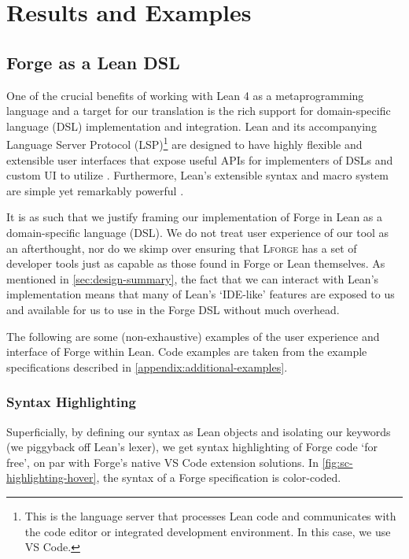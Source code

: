 \section{Results and Examples}

\subsection{Forge as a Lean DSL}\label{sec:dsl}
One of the crucial benefits of working with Lean 4 as a metaprogramming language and a target for our translation is the rich support for domain-specific language (DSL) implementation and integration. Lean and its accompanying Language Server Protocol (LSP)\footnote{This is the language server that processes Lean code and communicates with the code editor or integrated development environment. In this case, we use VS Code.} are designed to have highly flexible and extensible user interfaces that expose useful APIs for implementers of DSLs and custom UI to utilize \cite{moura2021lean, nawrocki2023extensible}. Furthermore, Lean's extensible syntax and macro system are simple yet remarkably powerful \cite{ullrich2022beyond, metaprogramming}. 

It is as such that we justify framing our implementation of Forge in Lean as a domain-specific language (DSL). We do not treat user experience of our tool as an afterthought, nor do we skimp over ensuring that \textsc{Lforge} has a set of developer tools just as capable as those found in Forge or Lean themselves. As mentioned in \cref{sec:design-summary}, the fact that we can interact with Lean's implementation means that many of Lean's `IDE-like' features are exposed to us and available for us to use in the Forge DSL without much overhead. 

The following are some (non-exhaustive) examples of the user experience and interface of Forge within Lean. Code examples are taken from the example specifications described in \cref{appendix:additional-examples}. 

\subsubsection{Syntax Highlighting}

Superficially, by defining our syntax as Lean objects and isolating our keywords (we piggyback off Lean's lexer), we get syntax highlighting of Forge code `for free', on par with Forge's native VS Code extension solutions. In \cref{fig:sc-highlighting-hover}, the syntax of a Forge specification is color-coded. 

